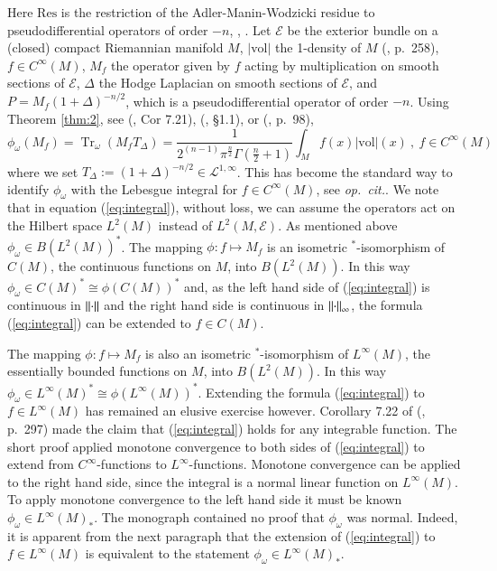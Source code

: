 \documentclass[final,1p]{elsarticle}
\numberwithin{equation}{section}
\theoremstyle{plain}
\theoremstyle{definition}
\begin{document}
Here $\mathrm{Res}$ is the restriction of the
Adler-Manin-Wodzicki residue to pseudodifferential operators of order $-n$, \cite{Wod}, \cite{C3}.  
Let $\mathcal{E}$ be the exterior bundle on a (closed) compact Riemannian manifold $M$, $|\mathrm{vol}|$ the 1-density of $M$ (\cite{GBVF}, p.~258),
$f \in C^\infty(M)$,
$M_f$ the operator given by $f$ acting by multiplication on smooth sections of $\mathcal{E}$,
$\Delta$ the Hodge Laplacian on smooth sections of $\mathcal{E}$, and $P = M_f (1+\Delta)^{-n/2}$, which is a pseudodifferential operator of order $-n$.
Using Theorem \ref{thm:2}, see (\cite{GBVF}, Cor 7.21), (\cite{FB}, \S 1.1), or (\cite{Landi}, p.~98),
\begin{equation} \label{eq:integral}
\phi_\omega(M_f) = \operatorname{Tr}_\omega(M_f T_\Delta) = \frac{1}{2^{(n-1)}\pi^{\frac{n}{2}}\Gamma(\frac{n}{2} + 1)} \int_{M} f(x) |\mathrm{vol}|(x) \ , \ f \in C^\infty(M)
\end{equation}
where we set $T_\Delta := (1+\Delta)^{-n/2} \in \mathcal{L}^{1,\infty}$.  This has become the standard way
to identify $\phi_\omega$ with the Lebesgue integral for $f \in C^\infty(M)$, see
\emph{op.~cit.}.  We note that in equation (\ref{eq:integral}), without loss, we can
assume the operators act on the Hilbert space $L^2(M)$ instead of
$L^2(M, \mathcal{E})$.  As mentioned above $\phi_\omega \in B(L^2(M))^*$.  The mapping
 $\phi: f \mapsto M_f$ is an isometric $^*$-isomorphism of $C(M)$, the continuous
 functions on $M$, into $B(L^2(M))$.  In this way $\phi_\omega \in C(M)^* \cong
 \phi(C(M))^*$ and, as the left hand side of (\ref{eq:integral}) is continuous in
 ${\mbox{\ensuremath{\| {\cdot} \|}}}$ and the right hand side is continuous in ${\mbox{\ensuremath{\| {\cdot} \|}}}_\infty$, the
 formula (\ref{eq:integral}) can be extended to $f \in C(M)$. 
 
\medskip The mapping $\phi: f \mapsto M_f$ is also an isometric $^*$-isomorphism of $L^\infty(M)$, the essentially bounded
functions on $M$, into $B(L^2(M))$.  In this way $\phi_\omega \in L^\infty(M)^* \cong \phi(L^\infty(M))^*$.  Extending the formula (\ref{eq:integral}) to $f \in L^\infty(M)$ has remained an elusive exercise however.  
Corollary 7.22 of (\cite{GBVF}, p.~297) made the claim that (\ref{eq:integral}) holds for any integrable function.  The short proof applied monotone convergence to both sides of (\ref{eq:integral}) to extend from $C^\infty$-functions to $L^\infty$-functions.
Monotone convergence can be applied to the right hand side, since the integral is a normal linear function on $L^\infty(M)$. 
To apply monotone convergence to the left hand side it must be known $\phi_\omega \in L^\infty(M)_*$.  The monograph \cite{GBVF} contained no proof that $\phi_\omega$ was normal.  Indeed, it is apparent from the next paragraph that the extension of (\ref{eq:integral}) to $f \in L^\infty(M)$ is equivalent to the statement $\phi_\omega \in L^\infty(M)_*$.
\end{document}
